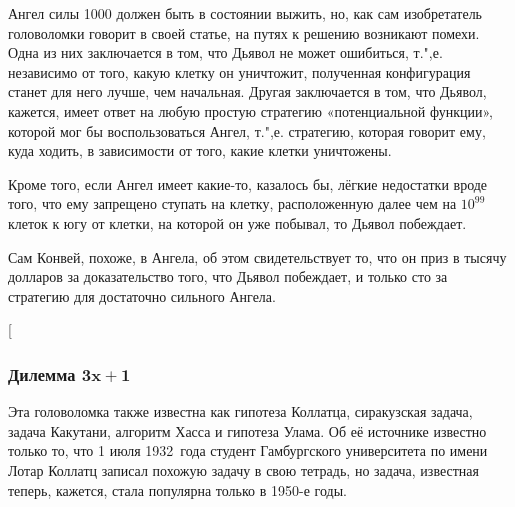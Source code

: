 \documentclass[twoside]{book}
\begin{document}
Ангел силы 1000 должен быть в состоянии выжить, но, как сам изобретатель головоломки говорит в своей статье, на путях к решению возникают помехи.
Одна из них заключается в том, что Дьявол не может ошибиться,
т.",е. независимо от того, какую клетку он уничтожит, полученная конфигурация станет для него лучше, чем начальная.
Другая заключается в том, что Дьявол, кажется, имеет ответ на любую простую стратегию «потенциальной функции», которой мог бы воспользоваться Ангел,
т.",е. стратегию, которая говорит ему, куда ходить, в зависимости от того, какие клетки уничтожены. 

Кроме того, если Ангел имеет какие-то, казалось бы, лёгкие недостатки вроде того, что ему запрещено ступать на клетку, расположенную далее чем на $10^{99}$ клеток к югу от клетки, на которой он уже побывал, то Дьявол побеждает.

Сам Конвей, похоже,  в Ангела, об этом свидетельствует то, что он  приз в тысячу долларов за доказательство того, что Дьявол побеждает, и только сто за стратегию для достаточно сильного Ангела.

[\?{Со времени публикации английского оригинала этой книги, задача была независимо решена как минимум 4 раза.
Решения Оддвара Клостера%
\footnote{
\emph{O. Kloster}. 
A solution to the angel problem /\!/
{Theoret. Comput. Sci.} 389 (2007), no. 1--2, 152--161.}
и Андре Мате%
\footnote{
\emph{A. Máthé}. 
The angel of power 2 wins /\!/ 
{Combin. Probab. Comput.} 16 (2007), no. 3, 363–374.}
работают для ангела силы 2.
Решение Брайна Боудича%
\footnote{\emph{B. H. Bowditch}.
  The angel game in the plane /\!/ {Combin. Probab. Comput.} 16 (2007), no. 3, 345--362.}
работает для ангела силы~4.
Решение Питера Гакса%
\footnote{\emph{P. G\'{a}cs}. {The angel wins.} arXiv:0706.2817 [math.CO].}
работает для ангела много б\'{о}льшей силы.]\footnote{Здесь и далее, квадратными скобками выделены примечания редакции.}}{нет в оригинале --- с согласия Питера}

\subsubsection*{Дилемма $\bm{3x+1}$}

Эта головоломка также известна как гипотеза Коллатца, сиракузская задача, задача Какутани, алгоритм Хасса и гипотеза Улама.
Об её источнике известно только то, что 1 июля 1932~года студент Гамбургского университета по имени Лотар Коллатц записал похожую задачу в свою тетрадь, но задача, известная теперь, кажется, стала популярна только в 1950-е годы.
\end{document}

